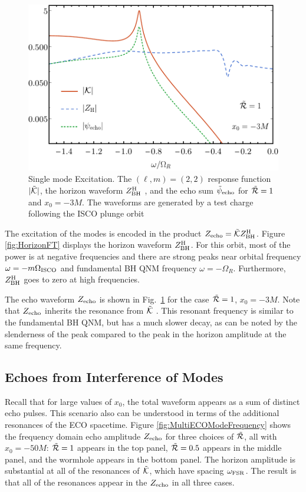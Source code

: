 \begin{refsection}
\begin{figure}[t]
\includegraphics[width = 1 \columnwidth]{chapter_echo/etc/singlemodeFreq}
\caption{
Single mode Excitation. The $(\ell,m)=(2,2)$ response function $|\tilde{\mathcal K}|$, the horizon waveform $Z^{\rm H}_{\rm BH}$ , and the echo sum $\tilde \psi_{\rm echo}$ for $\tilde{\mathcal R}=1$ and $x_0=-3M$. The waveforms are generated by a test charge following the ISCO plunge orbit
}
\label{fig:SingleECOModeFrequency}
\end{figure}

The excitation of the modes is encoded in the product $Z_{\rm echo}=\tilde{\mathcal K} Z^{\rm H}_{\rm BH}$. Figure \ref{fig:HorizonFT} displays the horizon waveform $Z^{\rm H}_{\rm BH}$. For this orbit, most of the power is at negative frequencies and there are strong peaks near orbital frequency $\omega =-m\Omega_{\rm ISCO}$ and fundamental BH QNM frequency $\omega =-\Omega_R$. Furthermore, $Z^{\rm H}_{\rm BH}$ goes to zero at high frequencies. 

The echo waveform $Z_{\rm echo}$ is shown in Fig.~\ref{fig:SingleECOModeFrequency} for the case $\tilde{\mathcal R}=1$, $x_0=-3M$.
Note that $Z_{\rm echo}$ inherits the resonance from $\tilde{\mathcal K}$ . 
This resonant frequency is similar to the fundamental BH QNM, but has a much slower decay, as can be noted by the slenderness of the peak compared to the peak in the horizon  amplitude at the same frequency.

\subsection{Echoes from Interference of Modes}
\label{sec:EchoInt}

Recall that for large values of $x_0$, the total waveform appears as a sum of distinct echo pulses. This scenario also can be understood in terms of the additional resonances of the ECO spacetime. 
Figure \ref{fig:MultiECOModeFrequency} shows  the frequency domain echo amplitude $Z_{\rm echo}$  for three choices of $\tilde{\mathcal R}$, all with $x_0=-50M$: $\tilde{\mathcal R}=1$ appears in the top panel, $\tilde{\mathcal R} =0.5$ appears in the middle panel, and the wormhole appears in the bottom panel. 
The horizon amplitude  is substantial at all of the resonances of $\tilde{\mathcal K}$, which have spacing $\omega_{\rm FSR}$. 
The result is that all of the resonances appear in the $Z_{\rm echo}$ in all three cases.


\end{refsection}
